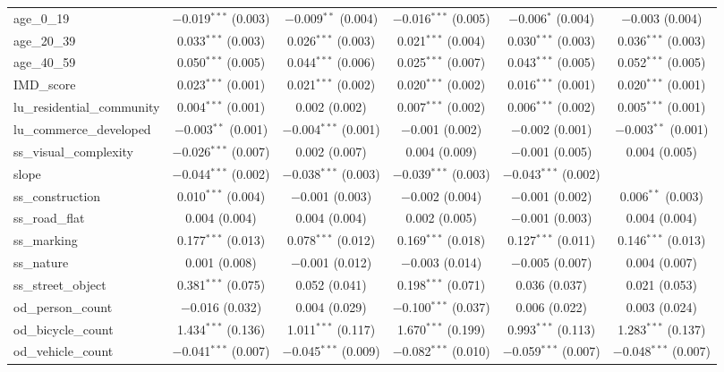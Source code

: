 \begin{table}[!htbp]
\begin{tabular}{@{\extracolsep{1pt}}lccccc}
  age\_0\_19 & $-$0.019$^{***}$ (0.003) & $-$0.009$^{**}$ (0.004) & $-$0.016$^{***}$ (0.005) & $-$0.006$^{*}$ (0.004) & $-$0.003 (0.004) \\ 
  age\_20\_39 & 0.033$^{***}$ (0.003) & 0.026$^{***}$ (0.003) & 0.021$^{***}$ (0.004) & 0.030$^{***}$ (0.003) & 0.036$^{***}$ (0.003) \\ 
  age\_40\_59 & 0.050$^{***}$ (0.005) & 0.044$^{***}$ (0.006) & 0.025$^{***}$ (0.007) & 0.043$^{***}$ (0.005) & 0.052$^{***}$ (0.005) \\ 
  IMD\_score & 0.023$^{***}$ (0.001) & 0.021$^{***}$ (0.002) & 0.020$^{***}$ (0.002) & 0.016$^{***}$ (0.001) & 0.020$^{***}$ (0.001) \\ 
  lu\_residential\_community & 0.004$^{***}$ (0.001) & 0.002 (0.002) & 0.007$^{***}$ (0.002) & 0.006$^{***}$ (0.002) & 0.005$^{***}$ (0.001) \\ 
  lu\_commerce\_developed & $-$0.003$^{**}$ (0.001) & $-$0.004$^{***}$ (0.001) & $-$0.001 (0.002) & $-$0.002 (0.001) & $-$0.003$^{**}$ (0.001) \\ 
  ss\_visual\_complexity & $-$0.026$^{***}$ (0.007) & 0.002 (0.007) & 0.004 (0.009) & $-$0.001 (0.005) & 0.004 (0.005) \\ 
  slope & $-$0.044$^{***}$ (0.002) & $-$0.038$^{***}$ (0.003) & $-$0.039$^{***}$ (0.003) & $-$0.043$^{***}$ (0.002) &  \\ 
  ss\_construction & 0.010$^{***}$ (0.004) & $-$0.001 (0.003) & $-$0.002 (0.004) & $-$0.001 (0.002) & 0.006$^{**}$ (0.003) \\ 
  ss\_road\_flat & 0.004 (0.004) & 0.004 (0.004) & 0.002 (0.005) & $-$0.001 (0.003) & 0.004 (0.004) \\ 
  ss\_marking & 0.177$^{***}$ (0.013) & 0.078$^{***}$ (0.012) & 0.169$^{***}$ (0.018) & 0.127$^{***}$ (0.011) & 0.146$^{***}$ (0.013) \\ 
  ss\_nature & 0.001 (0.008) & $-$0.001 (0.012) & $-$0.003 (0.014) & $-$0.005 (0.007) & 0.004 (0.007) \\ 
  ss\_street\_object & 0.381$^{***}$ (0.075) & 0.052 (0.041) & 0.198$^{***}$ (0.071) & 0.036 (0.037) & 0.021 (0.053) \\ 
  od\_person\_count & $-$0.016 (0.032) & 0.004 (0.029) & $-$0.100$^{***}$ (0.037) & 0.006 (0.022) & 0.003 (0.024) \\ 
  od\_bicycle\_count & 1.434$^{***}$ (0.136) & 1.011$^{***}$ (0.117) & 1.670$^{***}$ (0.199) & 0.993$^{***}$ (0.113) & 1.283$^{***}$ (0.137) \\ 
  od\_vehicle\_count & $-$0.041$^{***}$ (0.007) & $-$0.045$^{***}$ (0.009) & $-$0.082$^{***}$ (0.010) & $-$0.059$^{***}$ (0.007) & $-$0.048$^{***}$ (0.007) \\ 

\end{tabular}
\end{table}
